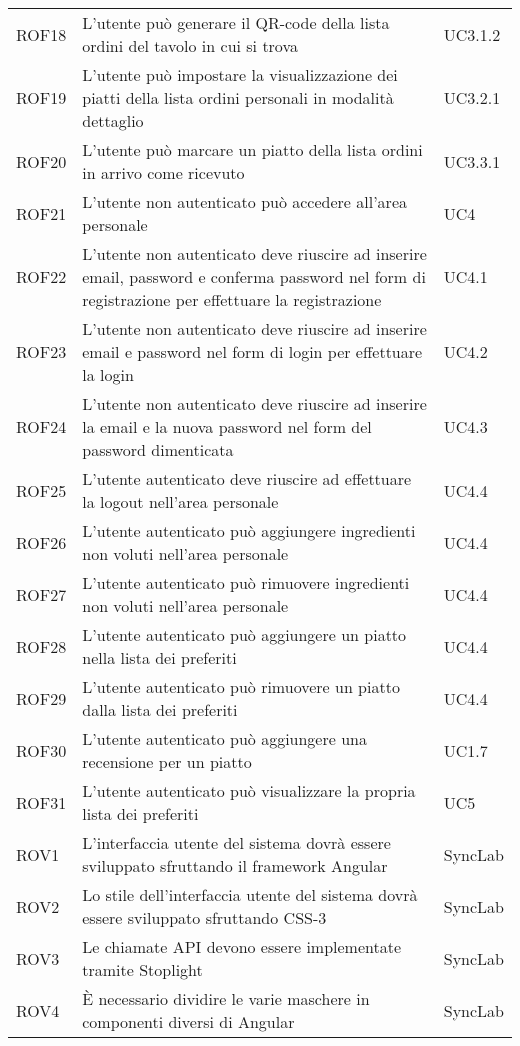 \begin{center}
\begin{longtable}{ |p{1.5cm}|p{9cm}|p{1.5cm}|  }
        ROF18&L'utente può generare il QR-code della lista ordini del tavolo in cui si trova &UC3.1.2 \\
        ROF19&L'utente può impostare la visualizzazione dei piatti della lista ordini personali in modalità dettaglio&UC3.2.1 \\
        ROF20&L'utente può marcare un piatto della lista ordini in arrivo come ricevuto&UC3.3.1 \\
        ROF21&L'utente non autenticato può accedere all'area personale&UC4\\
        ROF22&L'utente non autenticato deve riuscire ad inserire email, password e conferma password nel form di registrazione per effettuare la registrazione &UC4.1\\
        ROF23&L'utente non autenticato deve riuscire ad inserire email e password nel form di login per effettuare la login &UC4.2\\
        ROF24&L'utente non autenticato deve riuscire ad inserire la email e la nuova password nel form del password dimenticata&UC4.3\\
        ROF25&L'utente autenticato deve riuscire ad effettuare la logout nell'area personale&UC4.4\\
        ROF26&L'utente autenticato può aggiungere ingredienti non voluti nell'area personale&UC4.4\\
        ROF27&L'utente autenticato può rimuovere ingredienti non voluti nell'area personale&UC4.4\\
        ROF28&L'utente autenticato può aggiungere un piatto nella lista dei preferiti&UC4.4\\
        ROF29&L'utente autenticato può rimuovere un piatto dalla lista dei preferiti&UC4.4\\
        ROF30&L'utente autenticato può aggiungere una recensione per un piatto&UC1.7\\
        ROF31&L'utente autenticato può visualizzare la propria lista dei preferiti&UC5\\
        ROV1&L'interfaccia utente del sistema dovrà essere sviluppato sfruttando il framework Angular&SyncLab\\
        ROV2&Lo stile dell'interfaccia utente del sistema dovrà essere sviluppato sfruttando CSS-3&SyncLab\\
        ROV3&Le chiamate API devono essere implementate tramite Stoplight&SyncLab\\
        ROV4&È necessario dividire le varie maschere in componenti diversi di Angular&SyncLab\\

\end{longtable}
\end{center}
